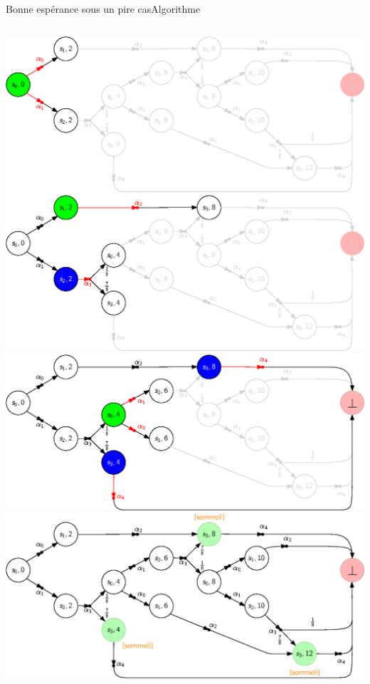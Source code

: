 \documentclass[compress]{beamer}
\theoremstyle{theorem}%
\begin{document}
\begin{frame}{Bonne espérance sous un pire cas}{Algorithme}
\begin{columns}
\begin{column}{0.45\linewidth}
\begin{overprint}
      \end{overprint}
    \end{column}
  \end{columns}
  \begin{overprint}
    \includegraphics[width=\linewidth]{resources/unfold1}
    \includegraphics[width=\linewidth]{resources/unfold2}
    \includegraphics[width=\linewidth]{resources/unfold3}
    \includegraphics[width=\linewidth]{resources/example-unfolding}
  \end{overprint}
\end{frame}
\end{document}
